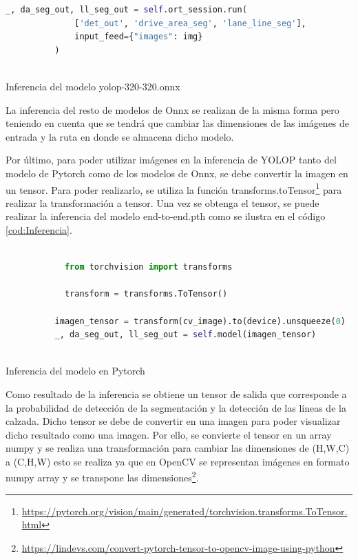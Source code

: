         \begin{code}[h]
          \begin{lstlisting}[language=Python]
            _, da_seg_out, ll_seg_out = self.ort_session.run(
              ['det_out', 'drive_area_seg', 'lane_line_seg'],
              input_feed={"images": img}
          )
        
          \end{lstlisting}
          \caption[Inferencia del modelo yolop-320-320.onnx]{Inferencia del modelo yolop-320-320.onnx}
          \label{cod:Inferencia_onnx}
          \end{code}  

        La inferencia del resto de modelos de Onnx se realizan de la misma forma pero teniendo en cuenta que se tendrá que cambiar las dimensiones de las imágenes de entrada y la ruta
        en donde se almacena dicho modelo. \newline

        Por último, para poder utilizar imágenes en la inferencia de YOLOP tanto del modelo de Pytorch como de los modelos de Onnx, se debe convertir la imagen en un tensor. Para poder realizarlo, se utiliza la función transforms.toTensor\footnote{\url{https://pytorch.org/vision/main/generated/torchvision.transforms.ToTensor.html}} 
        para realizar la transformación a tensor. Una vez se obtenga el tensor, se puede realizar la inferencia del modelo end-to-end.pth como se ilustra en el código \ref{cod:Inferencia}.
    
        \begin{code}[h]
          \begin{lstlisting}[language=Python]
         
            from torchvision import transforms
    
            transform = transforms.ToTensor() 
                        
          imagen_tensor = transform(cv_image).to(device).unsqueeze(0)
          _, da_seg_out, ll_seg_out = self.model(imagen_tensor)
        
          \end{lstlisting}
          \caption[Inferencia del modelo]{Inferencia del modelo en Pytorch}
          \label{cod:Inferencia}
          \end{code}  
    
        Como resultado de la inferencia se obtiene un tensor de salida que corresponde a la probabilidad de detección de la segmentación
        y la detección de las líneas de la calzada. Dicho tensor se debe de convertir en una imagen para poder visualizar
        dicho resultado como una imagen. 
        Por ello, se convierte el tensor en un array numpy y se realiza una transformación para cambiar las dimensiones de (H,W,C) 
        a (C,H,W) esto se realiza ya que en OpenCV se representan imágenes en formato numpy array y se transpone las dimensiones\footnote{\url{https://lindevs.com/convert-pytorch-tensor-to-opencv-image-using-python}}. 
    

